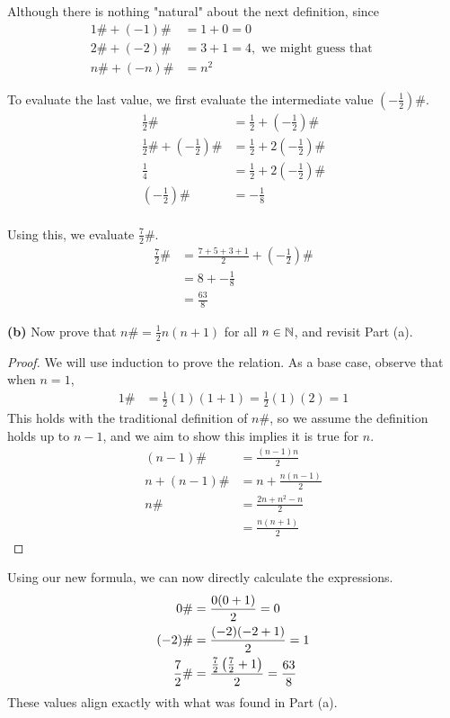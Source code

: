 \documentclass{exam}
\begin{document}
\begin{questions}
Although there is nothing "natural" about the next definition, since
\begin{align*}
    1\# + (-1)\# &= 1 + 0 = 0 \\
    2\# + (-2)\# &= 3 + 1 = 4,\text{ we might guess that } \\
    n\# + (-n)\# &= n^2
\end{align*}

To evaluate the last value, we first evaluate the intermediate value $(-\frac{1}{2})\#$.
\begin{align*}
    \frac{1}{2}\# &= \frac{1}{2} + (-\frac{1}{2})\# \\
    \frac{1}{2}\# + (-\frac{1}{2})\# &= \frac{1}{2} + 2(-\frac{1}{2})\# \\
    \frac{1}{4} &= \frac{1}{2} + 2(-\frac{1}{2})\# \\
    (-\frac{1}{2})\# &= -\frac{1}{8} \\
\end{align*}

Using this, we evaluate $\frac{7}{2}\#$.
\begin{align*}
    \frac{7}{2}\# &= \frac{7 + 5 + 3 + 1}{2} + (-\frac{1}{2})\# \\
    &= 8 + -\frac{1}{8} \\
    &= \frac{63}{8}
\end{align*}
\newpage



\textbf{(b) } Now prove that $n\# = \frac{1}{2}n(n + 1)$ for all $n\in\mathbb {N}$, and revisit Part (a). \\
\begin{proof}
    We will use induction to prove the relation. As a base case, observe that when $n = 1$, 
    \begin{align*}
        1\# &= \frac{1}{2}(1)(1 + 1) = \frac{1}{2}(1)(2) = 1
    \end{align*}
    This holds with the traditional definition of $n\#$, so we assume the definition holds up to $n - 1$, and we aim to show this implies it is true for $n$.
    \begin{align*}
        (n - 1)\# &= \frac{(n - 1)n}{2} \\
        n + (n - 1)\# &= n + \frac{n(n - 1)}{2} \\
        n\# &= \frac{2n + n^2 - n}{2} \\
        &= \frac{n(n + 1)}{2}
    \end{align*}
\end{proof}
Using our new formula, we can now directly calculate the expressions.
    \begin{align*}
        0\# &= \frac{0(0 + 1)}{2} = 0 \\
        (-2)\# &= \frac{(-2)(-2 + 1)}{2} = 1 \\
        \frac{7}{2}\# &= \frac{\frac{7}{2}\left( \frac{7}{2} + 1 \right)}{2} = \frac{63}{8}
    \end{align*}
    These values align exactly with what was found in Part (a).
\end{questions}
\end{document}
